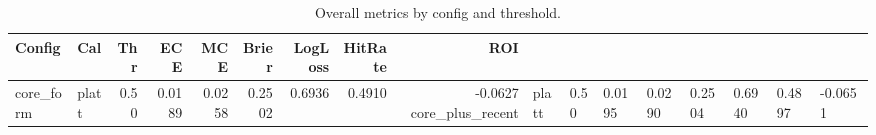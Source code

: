 \begin{table}[t]
  \centering
  \footnotesize
  \begin{threeparttable}
    \caption[GLM overall comparison]{Overall metrics by config and threshold.}
    \label{tab:glm-harness-overall}
    \setlength{\tabcolsep}{3pt}\renewcommand{\arraystretch}{1.1}
    \begin{tabular}{@{} l l r r r r r r r @{} }\toprule
      Config & Cal & Thr & ECE & MCE & Brier & LogLoss & HitRate & ROI \\ \midrule
      core_form & platt & 0.50 & 0.0189 & 0.0258 & 0.2502 & 0.6936 & 0.4910 & -0.0627 \
      core_plus_recent & platt & 0.50 & 0.0195 & 0.0290 & 0.2504 & 0.6940 & 0.4897 & -0.0651 \
      \bottomrule
    \end{tabular}
  \end{threeparttable}
\end{table}
